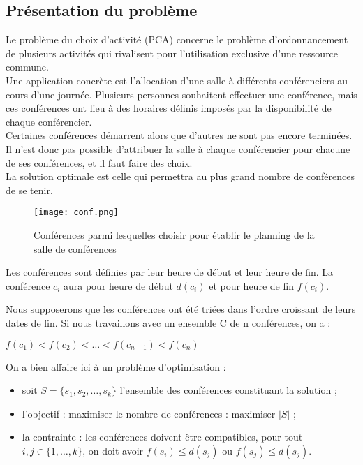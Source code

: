 \subsection*{Présentation du problème}

Le problème du choix d'activité (PCA) concerne le problème d'ordonnancement de plusieurs activités qui rivalisent pour l'utilisation exclusive d'une ressource commune.\\
Une application concrète est l'allocation d'une salle à différents conférenciers au cours d'une journée. Plusieurs personnes souhaitent effectuer une conférence, mais ces conférences ont lieu à des horaires définis imposés par la disponibilité de chaque conférencier.\\
 Certaines conférences démarrent alors que d'autres ne sont pas encore terminées. Il n'est donc pas possible d'attribuer la salle à chaque conférencier pour chacune de ses conférences, et il faut faire des choix.\\ 
La solution optimale est celle qui permettra au plus grand nombre de conférences de se tenir.


\begin{figure}[h]
	\centering
		\texttt{[image: conf.png]}
		\caption{Conférences parmi lesquelles choisir pour établir le planning de la salle de conférences}
	\label{fig:conf}
\end{figure}


Les conférences sont définies par leur heure de début et leur heure de fin. La conférence $c_i$ aura pour heure de début $d(c_i)$ et pour heure de fin $f(c_i)$.

Nous supposerons que les conférences ont été triées dans l'ordre croissant de leurs dates de fin. Si nous travaillons avec un ensemble C de n conférences, on a :
\begin{center} 
$f(c_1)<f(c_2)<\ldots<f(c_{n-1})<f(c_n)$
\end{center} 

On a bien affaire ici à un problème d'optimisation :
\begin{itemize}
\item soit $S={\{s_1,s_2,\ldots,s_k\}}$ l'ensemble des conférences constituant la solution ;
\item l'objectif : maximiser le nombre de conférences : maximiser $|S|$ ;
\item la contrainte :  les conférences doivent être compatibles, pour tout $i,j\in {\{1,…,k\}}$, on doit avoir $f(s_i )\leqslant d(s_j)$ ou $f(s_j )\leqslant d(s_j)$.
\end{itemize}

